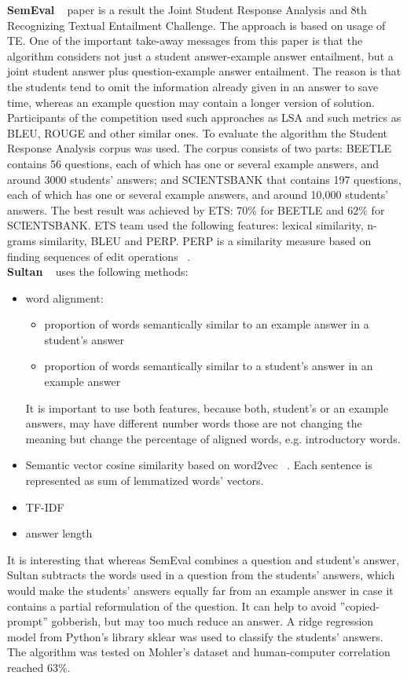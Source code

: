 \textbf{SemEval} ~\cite{SemEval} paper is a result the Joint Student Response Analysis and 8th Recognizing Textual Entailment Challenge. The approach is based on usage of TE. One of the important take-away messages from this paper is that the algorithm considers not just a student answer-example answer entailment, but a joint student answer plus question-example answer entailment. The reason is that the students tend to omit the information already given in an answer to save time, whereas an example question may contain a longer version of solution. Participants of the competition used such approaches as LSA and such metrics as BLEU, ROUGE and other similar ones. To evaluate the algorithm the Student Response Analysis corpus was used. The corpus consists of two parts: BEETLE contains 56 questions, each of which has one or several example answers, and around 3000 students' answers; and SCIENTSBANK that contains 197 questions, each of which has one or several example answers, and around 10,000 students' answers. The best result was achieved by ETS: 70\% for BEETLE and 62\% for SCIENTSBANK. ETS team used the following features: lexical similarity, n-grams similarity, BLEU and PERP. PERP is a similarity measure based on finding sequences of edit operations ~\cite{Heilman}.\\

\textbf{Sultan} ~\cite{Sultan} uses the following methods:
\begin{itemize}
\item word alignment:
\begin{itemize}
\item proportion of words semantically similar to an example answer in a student's answer
\item proportion of words semantically similar to a student's answer in an example answer
\end{itemize}
It is important to use both features, because both, student's or an example answers, may have different number words those are not changing the meaning but change the percentage of aligned words, e.g. introductory words. 
\item Semantic vector cosine similarity based on word2vec ~\cite{Baroni}. Each sentence is represented as sum of lemmatized words' vectors.
\item TF-IDF
\item answer length
\end{itemize} 

It is interesting that whereas SemEval combines a question and student's answer, Sultan subtracts the words used in a question from the students' answers, which would make the students' answers equally far from an example answer in case it contains a partial reformulation of the question. It can help to avoid ”copied-prompt” gobberish, but may too much reduce an answer. A ridge regression model from Python's library sklear was used to classify the students' answers. The algorithm was tested on Mohler's dataset and human-computer correlation reached 63\%.\\


